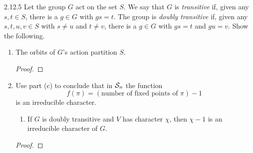 \documentclass{../../math174}
\date{Monday, April 15}
\author{}
\begin{document}
\begin{problemlist}
\item[2.12.5] Let the group \(G\) act on the set \(S\).  We say that
  \(G\) is \emph{transitive} if, given any \(s, t \in S\), there is a
  \(g \in G\) with \(gs = t\).  The group is \emph{doubly transitive}
  if, given any \(s, t, u, v \in S\) with \(s \ne u\) and \(t \ne v\),
  there is a \(g \in G\) with \(gs = t\) and \(gu = v\).  Show the
  following.
  \begin{enumerate}
  \item The orbits of \(G\)'s action partition \(S\).

    \begin{solution}
      \begin{proof}

      \end{proof}
    \end{solution}

    \setcounter{enumi}{3}

  \item Use part (c) to conclude that in \(\mathcal S_n\) the function
    \[
      f(\pi) = (\text{number of fixed points of \(\pi\)}) - 1
    \]
    is an irreducible character.

    \begin{book}
      \begin{enumerate}[label=(c)]
      \item If \(G\) is doubly transitive and \(V\) has character
        \(\chi\), then \(\chi-1\) is an irreducible character of
        \(G\).
      \end{enumerate}
    \end{book}

    \begin{solution}
      \begin{proof}

      \end{proof}
    \end{solution}
  \end{enumerate}
\end{problemlist}
\end{document}
